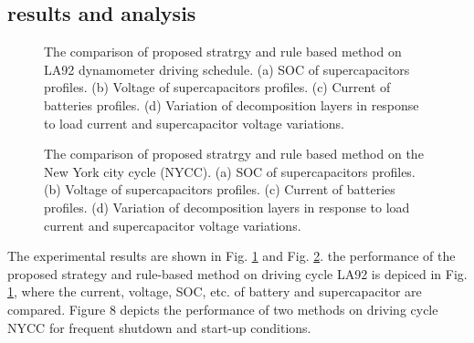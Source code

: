 \documentclass[energies,article,submit,moreauthors,pdftex,10pt,a4paper]{Definitions/mdpi}
\begin{document}

\subsection{results and analysis}

\begin{figure}[ht]
\centering  %
\caption{The comparison of proposed stratrgy and rule based method on LA92 dynamometer driving schedule. (a) SOC of supercapacitors profiles. (b) Voltage of supercapacitors profiles. (c) Current of batteries profiles. (d) Variation of decomposition layers in response to load current and supercapacitor voltage variations.}
\label{experiment_1}
\end{figure}

\begin{figure}[ht]
\centering  %
\caption{The comparison of proposed stratrgy and rule based method on the New York city cycle (NYCC). (a) SOC of supercapacitors profiles. (b) Voltage of supercapacitors profiles. (c) Current of batteries profiles. (d) Variation of decomposition layers in response to load current and supercapacitor voltage variations.}
\label{experiment_2}
\end{figure}


The experimental results are shown in Fig. \ref{experiment_1} and Fig. \ref{experiment_2}. 
the performance of the proposed strategy and rule-based method on driving cycle LA92 is depiced in Fig. \ref{experiment_1}, where the current, voltage, SOC, etc. of battery and supercapacitor are compared.
Figure 8 depicts the performance of two methods on driving cycle NYCC for frequent shutdown and start-up conditions.
\end{document}

